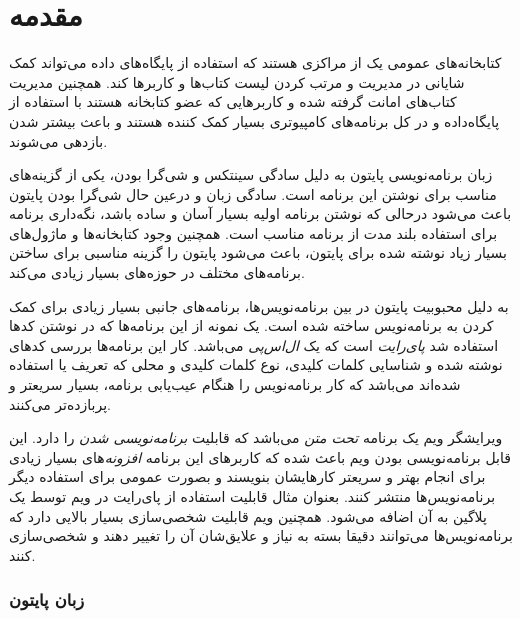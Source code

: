 \part{مقدمه}

کتابخانه‌های عمومی یک از مراکزی هستند که استفاده از پایگاه‌های داده
می‌تواند کمک شایانی در مدیریت و مرتب کردن لیست کتاب‌ها و کاربرها
کند. همچنین مدیریت کتاب‌های امانت گرفته شده و کاربرهایی که عضو
کتابخانه هستند با استفاده از پایگاه‌داده و در کل برنامه‌های کامپیوتری
بسیار کمک کننده هستند و باعث بیشتر شدن بازدهی می‌شوند.

زبان برنامه‌نویسی پایتون به دلیل سادگی سینتکس و شی‌گرا بودن، یکی از
گزینه‌های مناسب برای نوشتن این برنامه است. سادگی زبان و درعین حال شی‌گرا
بودن پایتون باعث می‌شود درحالی که نوشتن برنامه اولیه بسیار آسان و ساده
باشد، نگه‌داری برنامه برای استفاده بلند مدت از برنامه مناسب است. همچنین
وجود کتابخانه‌ها و ماژول‌های بسیار زیاد نوشته شده برای پایتون، باعث
می‌شود پایتون را گزینه مناسبی برای ساختن برنامه‌های مختلف در حوزه‌های
بسیار زیادی می‌کند.

به دلیل محبوبیت پایتون در بین برنامه‌نویس‌ها، برنامه‌های جانبی بسیار
زیادی برای کمک کردن به برنامه‌نویس ساخته شده است. یک نمونه از این برنامه‌ها
که در نوشتن کدها استفاده شد \textit{پای‌رایت} است که یک
\textit{ال‌اس‌پی}  می‌باشد. کار این
برنامه‌ها بررسی کدهای نوشته شده و شناسایی کلمات کلیدی، نوع کلمات کلیدی
و محلی که تعریف یا استفاده شده‌اند می‌باشد که کار برنامه‌نویس را هنگام
عیب‌یابی برنامه، بسیار سریعتر و پربازده‌تر می‌کنند.

ویرایشگر ویم یک برنامه \textit{تحت متن}
می‌باشد که قابلیت \textit{برنامه‌نویسی شدن}
را دارد. این قابل برنامه‌نویسی بودن ویم باعث شده که کاربرهای این برنامه
\textit{افزونه}‌های بسیار زیادی برای انجام بهتر و سریعتر
کارهایشان بنویسند و بصورت عمومی برای استفاده دیگر برنامه‌نویس‌ها منتشر
کنند. بعنوان مثال قابلیت استفاده از پای‌رایت در ویم توسط یک پلاگین به
آن اضافه می‌شود. همچنین ویم قابلیت شخصی‌سازی بسیار بالایی دارد که
برنامه‌نویس‌ها می‌توانند دقیقا بسته به نیاز و علایق‌شان آن را تغییر دهند و
شخصی‌سازی کنند.

\vfill\newpage

\section{زبان پایتون}

